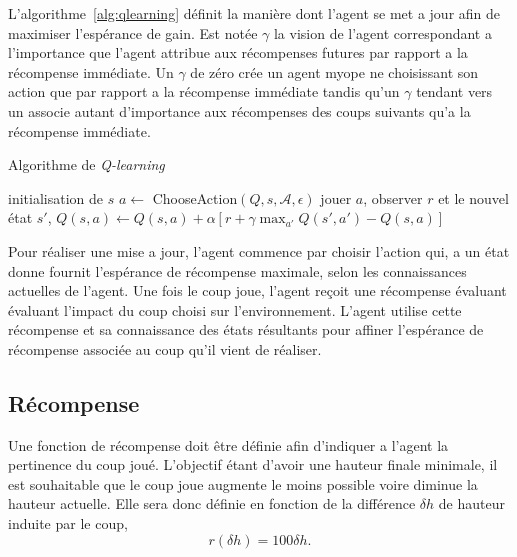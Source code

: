 \documentclass{report}
\begin{document}
L'algorithme~\ref{alg:qlearning} définit la manière dont l'agent se met a jour
afin de maximiser l'espérance de gain. Est notée \(\gamma\) la vision de
l'agent correspondant a l'importance que l'agent attribue aux récompenses
futures par rapport a la récompense immédiate. Un \(\gamma\) de zéro crée un
agent myope ne choisissant son action que par rapport a la récompense immédiate
tandis qu'un \(\gamma\) tendant vers un associe autant d'importance aux
récompenses des coups suivants qu'a la récompense immédiate.
\begin{algorithm}
  \caption{Algorithme de \textit{Q-learning}}\label{alg:qlearning}
  \begin{algorithmic}
    [1]
    \Repeat{}
    \State{} initialisation de \(s\)
    \Repeat{}
    \State{} \(a \gets\) ChooseAction$(Q, s, \mathcal{A}, \epsilon)$
    \State{} jouer \(a\), observer \(r\) et le nouvel \'etat \(s'\),
    \State{} \(Q(s, a) \gets Q(s, a) + \alpha\left[ r + \gamma \max_{a'}
      Q(s', a') - Q(s, a)\right]\)
    \EndProcedure{}
  \end{algorithmic}
\end{algorithm}

Pour réaliser une mise a jour, l'agent commence par choisir l'action qui, a un
état donne fournit l'espérance de récompense maximale, selon les connaissances
actuelles de l'agent. Une fois le coup joue, l'agent reçoit une récompense
évaluant évaluant l'impact du coup choisi sur l'environnement. L'agent utilise
cette récompense et sa connaissance des états résultants pour affiner
l'espérance de récompense associée au coup qu'il vient de réaliser.

\subsection{Récompense}
Une fonction de récompense doit être définie afin d'indiquer a l'agent la
pertinence du coup joué. L'objectif étant d'avoir une hauteur finale minimale,
il est souhaitable que le coup joue augmente le moins possible voire diminue la
hauteur actuelle. Elle sera donc définie en fonction de la différence \(\delta
h\) de hauteur induite par le coup,
\[
  r(\delta h) = 100\delta h.
\]
\end{document}

